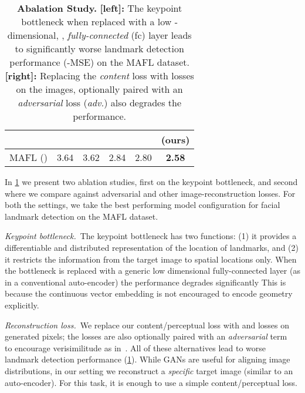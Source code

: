\documentclass{article}
\makeatletter
\renewcommand{\paragraph}{\@startsection{paragraph}{4}{\z@}{0em}{-1em}{\normalfont\normalsize\bfseries}}
\makeatother
\begin{document}
\begin{center}
\begin{table}[b]
\begin{minipage}{.59\linewidth}
{\begin{tabular}{@{}llcccc@{}}
                                        &                           &                                   &                           &                                   & \multicolumn{1}{l}{(ours)} \\ \midrule
    MAFL ()                     & 3.64                      & 3.62                              & 2.84                      & 2.80                              & \textbf{2.58}              \\ \bottomrule
    \end{tabular}}
  \end{minipage}\hfill \phantom{this wont show.}
\caption{\textbf{Abalation Study.} \textbf{[left]:} The keypoint bottleneck when replaced with a low -dimensional, , \emph{fully-connected} (fc) layer leads to significantly worse landmark detection performance (-MSE) on the MAFL dataset. \textbf{[right]:} Replacing the \emph{content} loss with  losses on the images, optionally paired with an \emph{adversarial} loss (\emph{adv.}) also degrades the performance.}
\label{tab:abalate}
\end{table}
\end{center}
 \paragraph{Ablation study.}
In \cref{tab:abalate} we present two ablation studies, first on the keypoint bottleneck, and second where we compare against adversarial and other image-reconstruction losses. For both the settings, we take the best performing model configuration for facial landmark detection on the MAFL dataset.

\emph{Keypoint bottleneck.}~The keypoint bottleneck has two functions: (1) it provides a differentiable and distributed representation of the location of landmarks, and (2) it restricts the information from the target image to spatial locations only. When the bottleneck is replaced with a generic low dimensional fully-connected layer (as in a conventional auto-encoder) the performance degrades significantly  This is because the continuous vector embedding is not encouraged to encode geometry explicitly.

\emph{Reconstruction loss.}~We replace our content/perceptual loss with  and  losses on generated pixels; the losses are also optionally paired with an \emph{adversarial} term~\cite{goodfellow2014generative} to encourage verisimilitude as in~\cite{pix2pix2017}. All of these alternatives lead to worse landmark detection performance (\cref{tab:abalate}). While GANs are useful for aligning image distributions, in our setting we reconstruct a \emph{specific} target image (similar to an auto-encoder). For this task, it is enough to use a simple content/perceptual loss.
\end{document}
